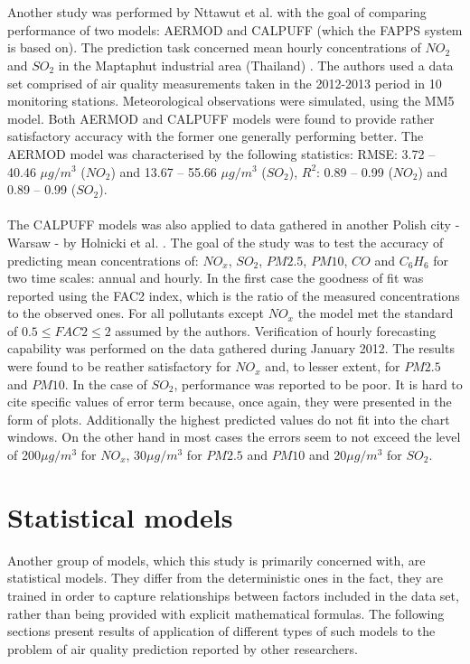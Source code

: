 \\\\
Another study was performed by Nttawut et al. with the goal of comparing performance of two models: AERMOD and CALPUFF (which the FAPPS system is based on). The prediction task concerned mean hourly concentrations of $NO_2$ and $SO_2$ in the Maptaphut industrial area (Thailand) \cite{NATTAWUT2015}. The authors used a data set comprised of air quality measurements taken in the 2012-2013 period in 10 monitoring stations. Meteorological observations were simulated, using the MM5 model. Both AERMOD and CALPUFF models were found to provide rather satisfactory accuracy with the former one generally performing better. The AERMOD model was characterised by the following statistics: RMSE: 3.72 – 40.46 $\mu g/m^3$ ($NO_2$) and 13.67 – 55.66 $\mu g/m^3$ ($SO_2$), $R^2$: 0.89 – 0.99 ($NO_2$) and 0.89 – 0.99 ($SO_2$).
\\\\
The CALPUFF models was also applied to data gathered in another Polish city - Warsaw - by Holnicki et al. \cite{HOLNICKI2016393}. The goal of the study was to test the accuracy of predicting mean concentrations of: $NO_x$, $SO_2$, $PM2.5$, $PM10$, $CO$ and $C_6H_6$ for two time scales: annual and hourly. In the first case the goodness of fit was reported  using the FAC2 index, which is the ratio of the measured concentrations to the observed ones. For all pollutants except $NO_x$ the model met the standard of $0.5 \leq FAC2 \leq 2$ assumed by the authors. Verification of hourly forecasting capability was performed on the data gathered during January 2012. The results were found to be reather satisfactory for $NO_x$ and, to lesser extent, for $PM2.5$ and $PM10$. In the case of $SO_2$, performance was reported to be poor. It is hard to cite specific values of error term because, once again, they were presented in the form of plots. Additionally the highest predicted values do not fit into the chart windows. On the other hand in most cases the errors seem to not exceed the level of 200$\mu g/m^3$ for $NO_x$, 30$\mu g/m^3$ for $PM2.5$ and $PM10$ and 20$\mu g/m^3$ for $SO_2$.

\section{Statistical models}
Another group of models, which this study is primarily concerned with, are statistical models. They differ from the deterministic ones in the fact, they are trained in order to capture relationships between factors included in the data set, rather than being provided with explicit mathematical formulas. The following sections present results of application of different types of such models to the problem of air quality prediction reported by other researchers.

